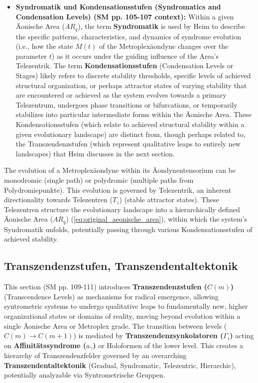 \documentclass[12pt]{article}
\newcommand{\conceptualsyndrome}{a}
\newcommand{\telezentrum}{T_z}
\newcommand{\aeonischearea}{AR_q}
\newcommand{\transzendenzstufe}[1]{C(#1)}
\newcommand{\transzendenzsynkolator}{\Gamma_i}
\begin{document}
\begin{itemize}
    \item \textbf{Syndromatik und Kondensationsstufen (Syndromatics and Condensation Levels) (SM pp. 105-107 context):}
    Within a given Äonische Area (\(\aeonischearea\)), the term \textbf{Syndromatik} is used by Heim to describe the specific patterns, characteristics, and dynamics of syndrome evolution (i.e., how the state \( M(t) \) of the Metroplexäondyne changes over the parameter \(t\)) as it occurs under the guiding influence of the Area's Telezentrik. The term \textbf{Kondensationsstufen} (Condensation Levels or Stages) likely refers to discrete stability thresholds, specific levels of achieved structural organization, or perhaps attractor states of varying stability that are encountered or achieved as the system evolves towards a primary Telezentrum, undergoes phase transitions or bifurcations, or temporarily stabilizes into particular intermediate forms within the Äonische Area. These Kondensationsstufen (which relate to achieved structural stability within a given evolutionary landscape) are distinct from, though perhaps related to, the Transzendenzstufen (which represent qualitative leaps to entirely new landscapes) that Heim discusses in the next section.
\end{itemize}

The evolution of a Metroplexäondyne within its Äondynentensorium can be monodromic (single path) or polydromic (multiple paths from Polydromiepunkte). This evolution is governed by Telezentrik, an inherent directionality towards Telezentren (\(\telezentrum\)) (stable attractor states). These Telezentren structure the evolutionary landscape into a hierarchically defined Äonische Area (\(\aeonischearea\)) (\eqref{eq:original_aeonische_area}), within which the system's Syndromatik unfolds, potentially passing through various Kondensationsstufen of achieved stability.

\subsection{Transzendenzstufen, Transzendentaltektonik}
\label{sec:transzendenz}

This section (SM pp. 109-111) introduces \textbf{Transzendenzstufen (\(\transzendenzstufe{m}\))} (Transcendence Levels) as mechanisms for radical emergence, allowing syntrometric systems to undergo qualitative leaps to fundamentally new, higher organizational states or domains of reality, moving beyond evolution within a single Äonische Area or Metroplex grade. The transition between levels (\(\transzendenzstufe{m} \to \transzendenzstufe{m+1}\)) is mediated by \textbf{Transzendenzsynkolatoren (\(\transzendenzsynkolator\))} acting on \textbf{Affinitätssyndrome (\(\conceptualsyndrome_\gamma\))} or Holoformen of the lower level. This creates a hierarchy of Transzendenzfelder governed by an overarching \textbf{Transzendentaltektonik} (Gradual, Syndromatic, Telezentric, Hierarchic), potentially analyzable via Syntrometrische Gruppen.
\end{document}
